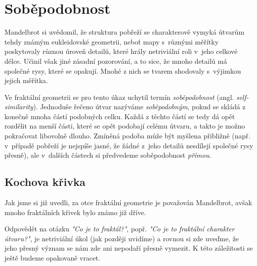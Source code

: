 \section{Soběpodobnost}\label{sec:sobepodobnost}
Mandelbrot si uvědomil, že struktura pobřeží se charakterově vymyká útvarům tehdy známým eukleidovské geometrii, neboť mapy s~různými měřítky poskytovaly různou úroveň detailů, které hrály netriviální roli v~jeho celkové délce. Učinil však jiné zásadní pozorování, a to sice, že mnoho detailů má společné rysy, které se opakují. Mnohé z nich se tvarem shodovaly s~výjimkou jejich měřítka. \citep[str. 96]{Mandelbrot1983}\par

Ve fraktální geometrii se pro tento úkaz uchytil termín \emph{soběpodobnost} (angl. \emph{self-similarity}). Jednoduše řečeno útvar nazýváme \emph{soběpodobným}, pokud se skládá z konečně mnoha částí podobných celku. Každá z těchto částí se tedy dá opět rozdělit na menší části, které se opět podobají celému útvaru, a takto je možno pokračovat libovolně dlouho. Zmíněná podoba může být myšlena přibližně (např. v~případě pobřeží je nejspíše jasné, že žádné z~jeho detailů nesdílejí společné rysy přesně), ale v~dalších částech si předvedeme soběpodobnost \emph{přímou}.

\subsection{Kochova křivka}\label{subsec:kochova_krivka}
Jak jsme si již uvedli, za otce fraktální geometrie je považován Mandelbrot, avšak mnoho fraktálních křivek bylo známo již dříve.

Odpovědět na otázku \emph{"Co je to fraktál?"}, popř. \emph{"Co je to fraktální charakter útvaru?"}, je netriviální úkol (jak později uvidíme) a rovnou si zde uveďme, že jeho přesný význam se nám zde ani nepodaří přesně vymezit. K této záležitosti se ještě budeme opakovaně vracet.

